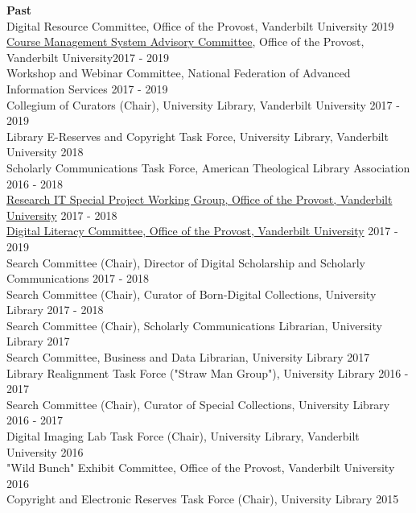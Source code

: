 \documentclass[10pt]{res} %
\begin{document}
\begin{resume}
{\bf Past} \\
Digital Resource Committee, Office of the Provost, Vanderbilt University \hfill 2019\\
\href{https://www.vanderbilt.edu/provost/committees/blackboard.php}{Course Management System Advisory Committee}, Office of the Provost, Vanderbilt University\hfill 2017 - 2019\\
Workshop and Webinar Committee, National Federation of Advanced Information Services \hfill 2017 - 2019\\
Collegium of Curators (Chair), University Library, Vanderbilt University  \hfill 2017 - 2019\\
Library E-Reserves and Copyright Task Force, University Library, Vanderbilt University \hfill 2018 \\
Scholarly Communications Task Force, American Theological Library Association \hfill 2016 - 2018 \\
\href{https://news.vanderbilt.edu/2017/03/17/new-working-group-to-assess-and-prioritize-opportunities-for-enhancing-research-it-resources-on-campus/}{Research IT Special Project Working Group, Office of the Provost, Vanderbilt University} \hfill 2017 - 2018 \\
\href{https://www.vanderbilt.edu/ed-tech/committees/digital-literacy-committee.php}{Digital Literacy Committee, Office of the Provost, Vanderbilt University} \hfill 2017 - 2019\\
Search Committee (Chair), Director of Digital Scholarship and Scholarly Communications \hfill 2017 - 2018 \\
Search Committee (Chair), Curator of Born-Digital Collections, University Library \hfill 2017 - 2018 \\
Search Committee (Chair), Scholarly Communications Librarian, University Library \hfill 2017 \\
Search Committee, Business and Data Librarian, University Library \hfill 2017 \\
Library Realignment Task Force ("Straw Man Group"), University Library \hfill 2016 - 2017 \\
Search Committee (Chair), Curator of Special Collections, University Library \hfill 2016 - 2017 \\
Digital Imaging Lab Task Force (Chair), University Library, Vanderbilt University \hfill 2016 \\
"Wild Bunch" Exhibit Committee, Office of the Provost, Vanderbilt University \hfill 2016 \\
Copyright and Electronic Reserves Task Force (Chair), University Library \hfill 2015 \\

\end{resume}
\end{document}
